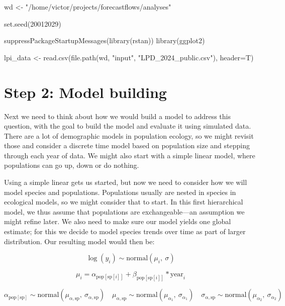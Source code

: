 \documentclass[
  letterpaper,
  DIV=11,
  numbers=noendperiod]{scrartcl}
\newenvironment{Shaded}{\begin{snugshade}}{\end{snugshade}}
\newcommand{\AttributeTok}[1]{\textcolor[rgb]{0.40,0.45,0.13}{#1}}
\newcommand{\DecValTok}[1]{\textcolor[rgb]{0.68,0.00,0.00}{#1}}
\newcommand{\FunctionTok}[1]{\textcolor[rgb]{0.28,0.35,0.67}{#1}}
\newcommand{\NormalTok}[1]{\textcolor[rgb]{0.00,0.23,0.31}{#1}}
\newcommand{\OtherTok}[1]{\textcolor[rgb]{0.00,0.23,0.31}{#1}}
\newcommand{\StringTok}[1]{\textcolor[rgb]{0.13,0.47,0.30}{#1}}
\begin{document}
\begin{Shaded}
\begin{Highlighting}[]
\NormalTok{wd }\OtherTok{\textless{}{-}} \StringTok{"/home/victor/projects/forecastflows/analyses"}

\FunctionTok{set.seed}\NormalTok{(}\DecValTok{20012029}\NormalTok{)}

\FunctionTok{suppressPackageStartupMessages}\NormalTok{(}\FunctionTok{library}\NormalTok{(rstan))}
\FunctionTok{library}\NormalTok{(ggplot2)}

\NormalTok{lpi\_data }\OtherTok{\textless{}{-}} \FunctionTok{read.csv}\NormalTok{(}\FunctionTok{file.path}\NormalTok{(wd, }\StringTok{"input"}\NormalTok{, }\StringTok{"LPD\_2024\_public.csv"}\NormalTok{), }\AttributeTok{header=}\NormalTok{T)}
\end{Highlighting}
\end{Shaded}

\section{Step 2: Model building}\label{step-2-model-building}

Next we need to think about how we would build a model to address this
question, with the goal to build the model and evaluate it using
simulated data. There are a lot of demographic models in population
ecology, so we might revisit those and consider a discrete time model
based on population size and stepping through each year of data. We
might also start with a simple linear model, where populations can go
up, down or do nothing.

Using a simple linear gets us started, but now we need to consider how
we will model species and populations. Populations usually are nested in
species in ecological models, so we might consider that to start. In
this first hierarchical model, we thus assume that populations are
exchangeable---an assumption we might refine later. We also need to make
sure our model yields one global estimate; for this we decide to model
species trends over time as part of larger distribution. Our resulting
model would then be:

\[\log(y_i) \sim \text{normal}(\mu_i, \ \sigma)\]

\[\mu_i = \alpha_{\text{pop}[\text{sp}[i]]} + \beta_{\text{pop}[\text{sp}[i]]} * \text{year}_i\]

\[\alpha_{\text{pop}[\text{sp}]}  \sim \text{normal}(\mu_{\alpha, \text{sp}}, \ \sigma_{\alpha, \text{sp}})
\quad \mu_{\alpha,\text{sp}} \sim \text{normal}(\mu_{\alpha_1}, \ \sigma_{\alpha_1}) 
\quad \sigma_{\alpha,\text{sp}} \sim \text{normal}(\mu_{\alpha_2}, \ \sigma_{\alpha_2}) \]
\end{document}
